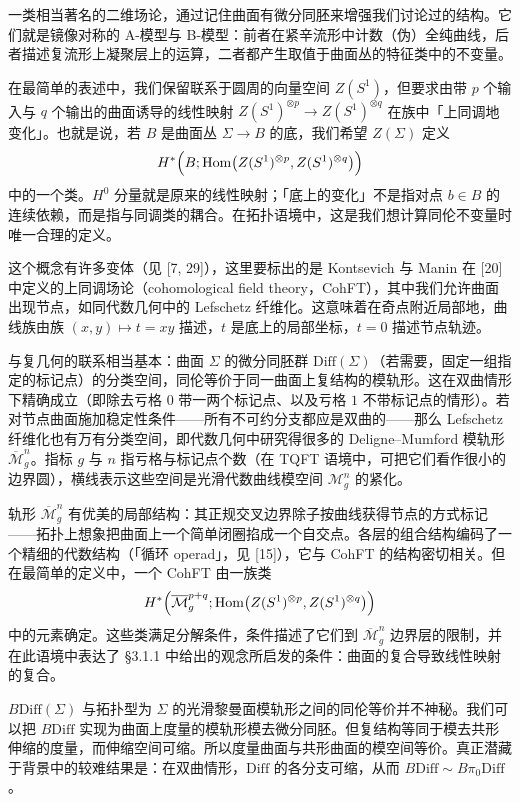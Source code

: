 一类相当著名的二维场论，通过记住曲面有微分同胚来增强我们讨论过的结构。它们就是镜像对称的 A-模型与 B-模型：前者在紧辛流形中计数（伪）全纯曲线，后者描述复流形上凝聚层上的运算，二者都产生取值于曲面丛的特征类中的不变量。

在最简单的表述中，我们保留联系于圆周的向量空间 $Z(S^1)$，但要求由带 $p$ 个输入与 $q$ 个输出的曲面诱导的线性映射 $Z(S^1)^{\otimes p}\to Z(S^1)^{\otimes q}$ 在族中「上同调地变化」。也就是说，若 $B$ 是曲面丛 $\Sigma\to B$ 的底，我们希望 $Z(\Sigma)$ 定义
\[
H^*\Bigl(B;\operatorname{Hom}\bigl(Z(S^1)^{\otimes p},Z(S^1)^{\otimes q}\bigr)\Bigr)
\]
中的一个类。$H^0$ 分量就是原来的线性映射；「底上的变化」不是指对点 $b\in B$ 的连续依赖，而是指与同调类的耦合。在拓扑语境中，这是我们想计算同伦不变量时唯一合理的定义。

这个概念有许多变体（见 [7, 29]），这里要标出的是 Kontsevich 与 Manin 在 [20] 中定义的上同调场论（cohomological field theory，CohFT），其中我们允许曲面出现节点，如同代数几何中的 Lefschetz 纤维化。这意味着在奇点附近局部地，曲线族由族 $(x,y)\mapsto t=xy$ 描述，$t$ 是底上的局部坐标，$t=0$ 描述节点轨迹。

与复几何的联系相当基本：曲面 $\Sigma$ 的微分同胚群 $\mathrm{Diff}(\Sigma)$（若需要，固定一组指定的标记点）的分类空间，同伦等价于同一曲面上复结构的模轨形。这在双曲情形下精确成立（即除去亏格 $0$ 带一两个标记点、以及亏格 $1$ 不带标记点的情形）。若对节点曲面施加稳定性条件——所有不可约分支都应是双曲的——那么 Lefschetz 纤维化也有万有分类空间，即代数几何中研究得很多的 Deligne--Mumford 模轨形 $\overline{\mathcal{M}}^n_g$。指标 $g$ 与 $n$ 指亏格与标记点个数（在 TQFT 语境中，可把它们看作很小的边界圆），横线表示这些空间是光滑代数曲线模空间 $\mathcal{M}^n_g$ 的紧化。

轨形 $\overline{\mathcal{M}}^n_g$ 有优美的局部结构：其正规交叉边界除子按曲线获得节点的方式标记——拓扑上想象把曲面上一个简单闭圈掐成一个自交点。各层的组合结构编码了一个精细的代数结构（「循环 operad」，见 [15]），它与 CohFT 的结构密切相关。但在最简单的定义中，一个 CohFT 由一族类
\[
H^*\Bigl(\overline{\mathcal{M}}^{p+q}_g;\operatorname{Hom}\bigl(Z(S^1)^{\otimes p},Z(S^1)^{\otimes q}\bigr)\Bigr)
\]
中的元素确定。这些类满足分解条件，条件描述了它们到 $\overline{\mathcal{M}}^n_g$ 边界层的限制，并在此语境中表达了 §3.1.1 中给出的观念所启发的条件：曲面的复合导致线性映射的复合。

\begin{remark}
$B\mathrm{Diff}(\Sigma)$ 与拓扑型为 $\Sigma$ 的光滑黎曼面模轨形之间的同伦等价并不神秘。我们可以把 $B\mathrm{Diff}$ 实现为曲面上度量的模轨形模去微分同胚。但复结构等同于模去共形伸缩的度量，而伸缩空间可缩。所以度量曲面与共形曲面的模空间等价。真正潜藏于背景中的较难结果是：在双曲情形，$\mathrm{Diff}$ 的各分支可缩，从而 $B\mathrm{Diff}\sim B\pi_0\mathrm{Diff}$。
\end{remark}


